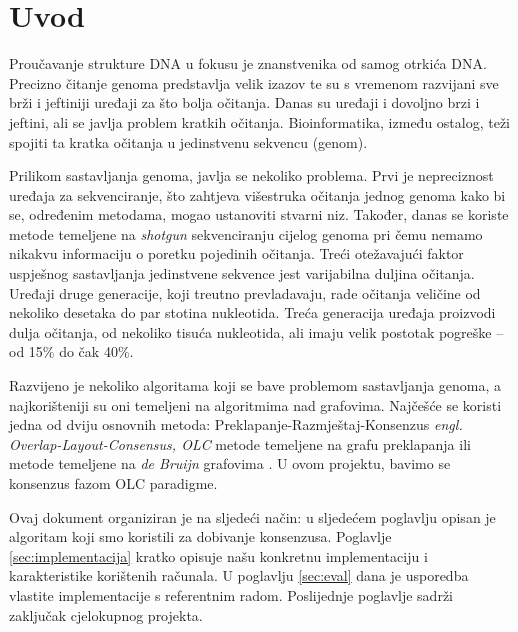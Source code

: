 \chapter{Uvod}

Proučavanje strukture DNA u fokusu je znanstvenika od samog otrkića DNA.
Precizno čitanje genoma predstavlja velik izazov te su s vremenom razvijani sve brži i jeftiniji uređaji za što bolja očitanja.
Danas su uređaji i dovoljno brzi i jeftini, ali se javlja problem kratkih očitanja.
Bioinformatika, između ostalog, teži spojiti ta kratka očitanja u jedinstvenu sekvencu (genom).

Prilikom sastavljanja genoma, javlja se nekoliko problema.
Prvi je nepreciznost uređaja za sekvenciranje, što zahtjeva višestruka očitanja jednog genoma kako bi se, određenim metodama, mogao ustanoviti stvarni niz.
Također, danas se koriste metode temeljene na \emph{shotgun} sekvenciranju cijelog genoma pri čemu nemamo nikakvu informaciju o poretku pojedinih očitanja.
Treći otežavajući faktor uspješnog sastavljanja jedinstvene sekvence jest varijabilna duljina očitanja.
Uređaji druge generacije, koji treutno prevladavaju, rade očitanja veličine od nekoliko desetaka do par stotina nukleotida.
Treća generacija uređaja proizvodi dulja očitanja, od nekoliko tisuća nukleotida, ali imaju velik postotak pogreške -- od 15\% do čak 40\%.

Razvijeno je nekoliko algoritama koji se bave problemom sastavljanja genoma, a najkorišteniji su oni temeljeni na algoritmima nad grafovima.
Najčešće se koristi jedna od dviju osnovnih metoda: Preklapanje-Razmještaj-Konsenzus \emph{engl. Overlap-Layout-Consensus, OLC} metode temeljene na grafu preklapanja ili metode temeljene na \emph{de Bruijn} grafovima \citep{sikic2013bioinformatika}.
U ovom projektu, bavimo se konsenzus fazom OLC paradigme.

Ovaj dokument organiziran je na sljedeći način: u sljedećem poglavlju opisan je algoritam koji smo koristili za dobivanje konsenzusa.
Poglavlje \ref{sec:implementacija} kratko opisuje našu konkretnu implementaciju i karakteristike korištenih računala.
U poglavlju \ref{sec:eval} dana je usporedba vlastite implementacije s referentnim radom.
Poslijednje poglavlje sadrži zaključak cjelokupnog projekta.


